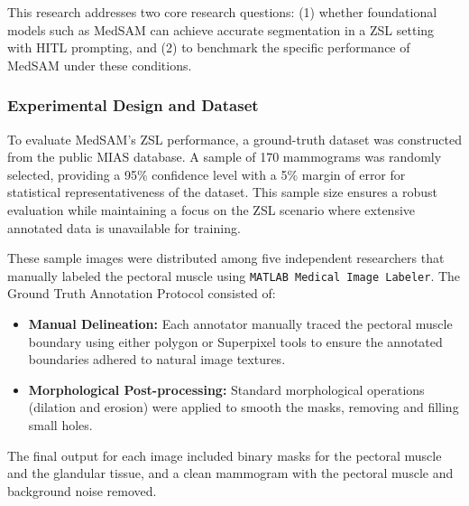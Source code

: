 \documentclass[runningheads]{llncs}
\begin{document}
This research addresses two core research questions: (1) whether
foundational models such as \ac{MedSAM} can achieve accurate
segmentation in a \ac{ZSL} setting with \ac{HITL} prompting, and (2)
to benchmark the specific performance of \ac{MedSAM} under these
conditions.

\subsubsection{Experimental Design and Dataset}
To evaluate \ac{MedSAM}'s \ac{ZSL} performance, a ground-truth dataset
was constructed from the public \ac{MIAS} database. A sample of 170
mammograms was randomly selected, providing a 95\% confidence level
with a 5\% margin of error for statistical representativeness of the
dataset. This sample size ensures a robust evaluation while
maintaining a focus on the \ac{ZSL} scenario where extensive annotated
data is unavailable for training.

These sample images were distributed among five independent researchers
that manually labeled the pectoral muscle using \texttt{MATLAB Medical
  Image Labeler}. The Ground Truth Annotation Protocol consisted of:


\begin{itemize}
    \item \textbf{Manual Delineation:} Each annotator manually traced
      the pectoral muscle boundary using either polygon or Superpixel
      tools to ensure the annotated boundaries adhered to natural
      image textures.
    \item \textbf{Morphological Post-processing:} Standard
      morphological operations (dilation and erosion) were applied to
      smooth the masks, removing and filling small holes.
\end{itemize}

The final output for each image included binary masks for the
pectoral muscle and the glandular tissue, and a clean mammogram with
the pectoral muscle and background noise removed. 
\end{document}
